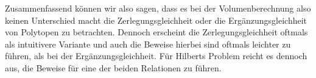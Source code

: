 \documentclass[11pt,titlepage]{article}
\theoremstyle{definition}
\theoremstyle{remark}
\begin{document}
	Zusammenfassend können wir also sagen, dass es bei der Volumenberechnung 
	also keinen Unterschied macht die Zerlegungsgleichheit oder die 
	Ergänzungsgleichheit von Polytopen zu betrachten. Dennoch erscheint die 
	Zerlegungsgleichheit oftmals als intuitivere Variante und auch die Beweise 
	hierbei sind oftmals leichter zu führen, als bei der Ergänzungsgleichheit. 
	Für Hilberts Problem reicht es dennoch aus, die Beweise für eine 
	der beiden Relationen zu führen.

	\newpage
	
	
\end{document}
